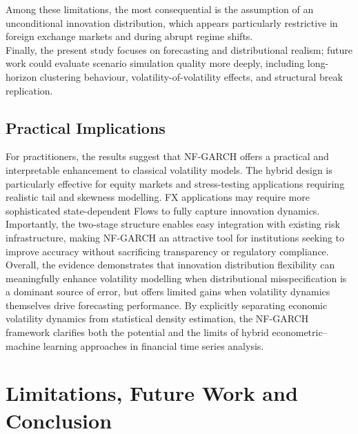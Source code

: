 \documentclass[oneside,12pt]{CUEDthesisPSnPDF}
\begin{document}
Among these limitations, the most consequential is the assumption of an unconditional innovation distribution, which appears particularly restrictive in foreign exchange markets and during abrupt regime shifts.\\

Finally, the present study focuses on forecasting and distributional realism; future work could evaluate scenario simulation quality more deeply, including long-horizon clustering behaviour, volatility-of-volatility effects, and structural break replication.\\

\section{Practical Implications}

\noindent
For practitioners, the results suggest that NF-GARCH offers a practical and interpretable enhancement to classical volatility models. The hybrid design is particularly effective for equity markets and stress-testing applications requiring realistic tail and skewness modelling. FX applications may require more sophisticated state-dependent Flows to fully capture innovation dynamics. Importantly, the two-stage structure enables easy integration with existing risk infrastructure, making NF-GARCH an attractive tool for institutions seeking to improve accuracy without sacrificing transparency or regulatory compliance.\\

Overall, the evidence demonstrates that innovation distribution flexibility can meaningfully enhance volatility modelling when distributional misspecification is a dominant source of error, but offers limited gains when volatility dynamics themselves drive forecasting performance. By explicitly separating economic volatility dynamics from statistical density estimation, the NF-GARCH framework clarifies both the potential and the limits of hybrid econometric--machine learning approaches in financial time series analysis.\\


\chapter{Limitations, Future Work and Conclusion}
\end{document}
